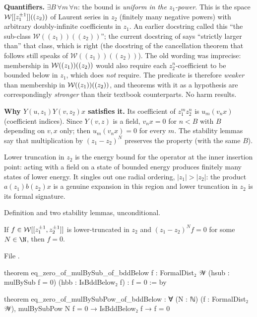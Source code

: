 \begin{dictionary}
\textbf{Quantifiers.} $\exists B\,\forall m\,\forall n$: the bound is \emph{uniform in the $z_1$-power}. This is the
space $\mathcal{W}[[z_1^{\pm1}]]((z_2))$ of Laurent series in $z_2$ (finitely many negative powers) with arbitrary
doubly-infinite coefficients in $z_1$. An earlier docstring called this ``the sub-class $\mathcal W((z_1))((z_2))$''; the
current docstring of  says ``strictly larger than'' that class, which is right (the docstring of the
cancellation theorem that follows still speaks of $\mathcal W((z_1))((z_2))$). The old wording was imprecise: membership in $\mathcal{W}((z_1))((z_2))$ would also require each $z_2^n$-coefficient to be bounded below
in $z_1$, which  does \emph{not} require. The predicate is therefore \emph{weaker} than
membership in $\mathcal{W}((z_1))((z_2))$, and theorems with it as a hypothesis are correspondingly \emph{stronger} than
their textbook counterparts. No harm results.

\textbf{Why $Y(u,z_1)Y(v,z_2)x$ satisfies it.} Its coefficient of $z_1^mz_2^n$ is $u_m(v_nx)$ (coefficient indices).
Since $Y(v,z)$ is a field, $v_nx = 0$ for $n<B$ with $B$ depending on $v,x$ only; then $u_m(v_nx) = 0$ for every $m$.
The stability lemmas say that multiplication by $(z_1-z_2)^N$ preserves the property (with the same $B$).
\end{dictionary}

\begin{physics}
Lower truncation in $z_2$ is the energy bound for the operator at the inner insertion point: acting with a
field on a state of bounded energy produces finitely many states of lower energy. It singles out one radial
ordering, $|z_1|>|z_2|$: the product $a(z_1)b(z_2)x$ is a genuine expansion in this region and lower truncation in
$z_2$ is its formal signature.
\end{physics}

\begin{status}
Definition and two stability lemmas, unconditional.
\end{status}

\begin{theorem}\label{l01:thm:cancel}
If $f\in\mathcal{W}[[z_1^{\pm1},z_2^{\pm1}]]$ is lower-truncated in $z_2$ and $(z_1-z_2)^Nf = 0$ for some $N\in\N$, then $f = 0$.
\end{theorem}

\noindent File .
\begin{leancode}
theorem eq_zero_of_mulBySub_of_bddBelow {f : FormalDist₂ 𝒲} (hsub : mulBySub f = 0)
    (hbb : IsBddBelow₂ f) : f = 0 := by

theorem eq_zero_of_mulBySubPow_of_bddBelow :
    ∀ (N : ℕ) (f : FormalDist₂ 𝒲), mulBySubPow N f = 0 → IsBddBelow₂ f → f = 0
\end{leancode}

